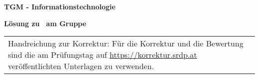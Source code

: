 \documentclass[10pt,a4paper]{article}
\makeatletter
\newcommand{\myID}{\@ID}
\newcommand{\myDate}{\@Date}
\newcommand{\myTitle}{\@Title}
\makeatother
\begin{document}
\thispagestyle{empty}
{\sf
\textbf{\LARGE{TGM - Informationstechnologie}}

\textbf{\large{ Lösung zu \myTitle \, am \myDate \hfill Gruppe \myID}}

\vspace*{2cm}

\begin{tabular}{p{14cm}}
\par{%
Handreichung zur Korrektur:
Für die Korrektur und die Bewertung sind die am Prüfungstag auf \url{https://korrektur.srdp.at} veröffentlichten Unterlagen zu verwenden. 

}
\end{tabular}}
\end{document}
